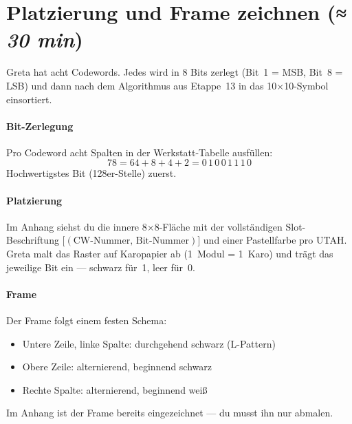 \section{Platzierung und Frame zeichnen
         \normalfont(\textit{≈ 30 min})}

Greta hat acht Codewords. Jedes wird in 8 Bits zerlegt (Bit~1 = MSB,
Bit~8 = LSB) und dann nach dem Algorithmus aus Etappe~13 in das
10×10-Symbol einsortiert.

\paragraph{Bit-Zerlegung} Pro Codeword acht Spalten in der
Werkstatt-Tabelle ausfüllen:
\[
  78 = 64 + 8 + 4 + 2 = 0\,1\,0\,0\,1\,1\,1\,0
\]
Hochwertigstes Bit (128er-Stelle) zuerst.

\paragraph{Platzierung} Im Anhang siehst du die innere 8×8-Fläche
mit der vollständigen Slot-Beschriftung
\(\bigl[(\text{CW-Nummer},\,\text{Bit-Nummer})\bigr]\) und einer
Pastellfarbe pro UTAH. Greta malt das Raster auf Karopapier ab
(1~Modul = 1~Karo) und trägt das jeweilige Bit ein — schwarz für~1,
leer für~0.

\paragraph{Frame} Der Frame folgt einem festen Schema:

\begin{itemize}
\item Untere Zeile, linke Spalte: durchgehend schwarz (L-Pattern)
\item Obere Zeile: alternierend, beginnend schwarz
\item Rechte Spalte: alternierend, beginnend weiß
\end{itemize}

Im Anhang ist der Frame bereits eingezeichnet — du musst ihn nur
abmalen.

